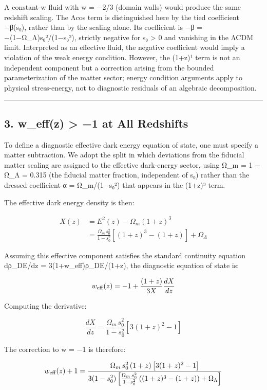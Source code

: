 A constant-w fluid with w = −2/3 (domain walls) would produce the same
redshift scaling. The Λcos term is distinguished here by the tied
coefficient −β(s₀), rather than by the scaling alone. Its coefficient is
−β = −(1−Ω\_Λ)s₀²/(1−s₀²), strictly negative for s₀ \textgreater{} 0 and
vanishing in the ΛCDM limit. Interpreted as an effective fluid, the
negative coefficient would imply a violation of the weak energy
condition. However, the (1+z)¹ term is not an independent component but
a correction arising from the bounded parameterization of the matter
sector; energy condition arguments apply to physical stress-energy, not
to diagnostic residuals of an algebraic decomposition.

\begin{center}\rule{0.5\linewidth}{0.5pt}\end{center}

\subsection{3. w\_eff(z) \textgreater{} −1 at All
Redshifts}\label{w_effz-1-at-all-redshifts}

To define a diagnostic effective dark energy equation of state, one must
specify a matter subtraction. We adopt the split in which deviations
from the fiducial matter scaling are assigned to the effective
dark-energy sector, using Ω\_m = 1 − Ω\_Λ = 0.315 (the fiducial matter
fraction, independent of s₀) rather than the dressed coefficient α =
Ω\_m/(1−s₀²) that appears in the (1+z)³ term.

The effective dark energy density is then:

\[\begin{aligned}
X(z) &= E^2(z) - \Omega_m(1+z)^3 \\
     &= \frac{\Omega_m\, s_0^2}{1 - s_0^2}\left[(1+z)^3 - (1+z)\right] + \Omega_\Lambda
\end{aligned}\]

Assuming this effective component satisfies the standard continuity
equation dρ\_DE/dz = 3(1+w\_eff)ρ\_DE/(1+z), the diagnostic equation of
state is:

\[w_{\rm eff}(z) = -1 + \frac{(1+z)}{3X}\frac{dX}{dz}\]

Computing the derivative:

\[\frac{dX}{dz} = \frac{\Omega_m\, s_0^2}{1 - s_0^2}\left[3(1+z)^2 - 1\right]\]

The correction to w = −1 is therefore:

\[w_{\rm eff}(z) + 1 = \frac{\Omega_m\, s_0^2\,(1+z)\left[3(1+z)^2 - 1\right]}{3(1 - s_0^2)\left[\frac{\Omega_m\, s_0^2}{1 - s_0^2}\left((1+z)^3 - (1+z)\right) + \Omega_\Lambda\right]}\]

